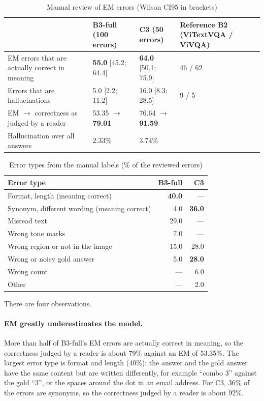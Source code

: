 \begin{table}[htbp]
\caption{Manual review of EM errors (Wilson CI95 in brackets)}
\label{tab:dis-audit}
\centering
\small
\begin{tabular}{p{}p{}p{}p{}}
\toprule
 & \textbf{B3-full (100 errors)} & \textbf{C3 (50 errors)} & \textbf{Reference B2 (ViTextVQA / ViVQA)} \\
\midrule
EM errors that are actually correct in meaning & \textbf{55.0} [45.2; 64.4] & \textbf{64.0} [50.1; 75.9] & 46 / 62 \\
Errors that are hallucinations & 5.0 [2.2; 11.2] & 16.0 [8.3; 28.5] & 9 / 5 \\
EM $\to$ correctness as judged by a reader & 53.35 $\to$ \textbf{79.01} & 76.64 $\to$ \textbf{91.59} & \\
Hallucination over all answers & 2.33\% & 3.74\% & \\
\bottomrule
\end{tabular}
\end{table}

\begin{table}[htbp]
\caption{Error types from the manual labels (\% of the reviewed errors)}
\label{tab:dis-audit-types}
\centering
\small
\begin{tabular}{p{}rr}
\toprule
\textbf{Error type} & \textbf{B3-full} & \textbf{C3} \\
\midrule
Format, length (meaning correct) & \textbf{40.0} & --- \\
Synonym, different wording (meaning correct) & 4.0 & \textbf{36.0} \\
Misread text & 29.0 & --- \\
Wrong tone marks & 7.0 & --- \\
Wrong region or not in the image & 15.0 & 28.0 \\
Wrong or noisy gold answer & 5.0 & \textbf{28.0} \\
Wrong count & --- & 6.0 \\
Other & --- & 2.0 \\
\bottomrule
\end{tabular}
\end{table}

There are four observations.

\paragraph{EM greatly underestimates the model.} More than half of B3-full's EM errors are
actually correct in meaning, so the correctness judged by a reader is about 79\% against an
EM of 53.35\%. The largest error type is format and length (40\%): the answer and the gold
answer have the same content but are written differently, for example ``combo 3'' against
the gold ``3'', or the spaces around the dot in an email address. For C3, 36\% of the errors
are synonyms, so the correctness judged by a reader is about 92\%.

